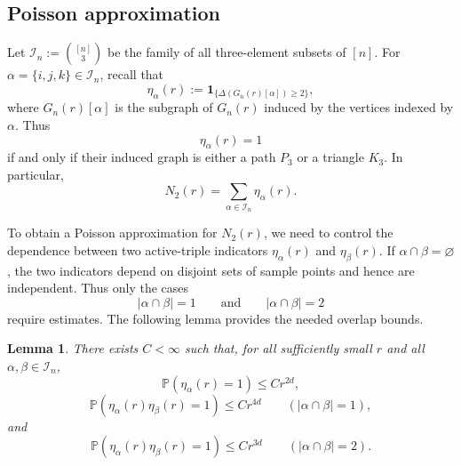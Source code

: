 \documentclass[11pt]{article}
\newtheorem{lemma}[theorem]{Lemma}
\theoremstyle{remark}
\newcommand{\ind}{\mathbf 1}
\newcommand{\Pp}{\mathbb P}
\numberwithin{equation}{section}
\begin{document}
\subsection{Poisson approximation}

Let $\mathcal I_n:=\binom{[n]}{3}$
be the family of all three-element subsets of \([n]\).
For
$\alpha=\{i,j,k\}\in\mathcal I_n$,
recall that
\[
\eta_\alpha(r)
:=
\ind_{\{\Delta(G_n(r)[\alpha])\ge2\}},
\]
where \(G_n(r)[\alpha]\) is the subgraph of \(G_n(r)\) induced by the
vertices indexed by \(\alpha\).
Thus
\[
\eta_\alpha(r)=1
\]
if and only if their induced graph is either a path \(P_3\) or
a triangle \(K_3\).  In particular,
\[
N_2(r)
=
\sum_{\alpha\in\mathcal I_n}\eta_\alpha(r).
\]

To obtain a Poisson approximation for \(N_2(r)\), we need to control the
dependence between two active-triple indicators
\(\eta_\alpha(r)\) and \(\eta_\beta(r)\).
If \(\alpha\cap\beta=\varnothing\), the two indicators depend on disjoint
sets of sample points and hence are independent.  Thus only the cases
\[
|\alpha\cap\beta|=1
\qquad\text{and}\qquad
|\alpha\cap\beta|=2
\]
require estimates.  The following lemma provides the needed overlap
bounds.

\begin{lemma}\label{lem:triple-overlap}
There exists \(C<\infty\) such that, for all sufficiently small \(r\) and
all \(\alpha,\beta\in\mathcal I_n\),
\[
\Pp(\eta_\alpha(r)=1)\le Cr^{2d},
\]
\[
\Pp(\eta_\alpha(r)\eta_\beta(r)=1)\le Cr^{4d}
\qquad (|\alpha\cap\beta|=1),
\]
and
\[
\Pp(\eta_\alpha(r)\eta_\beta(r)=1)\le Cr^{3d}
\qquad (|\alpha\cap\beta|=2).
\]
\end{lemma}
\end{document}
